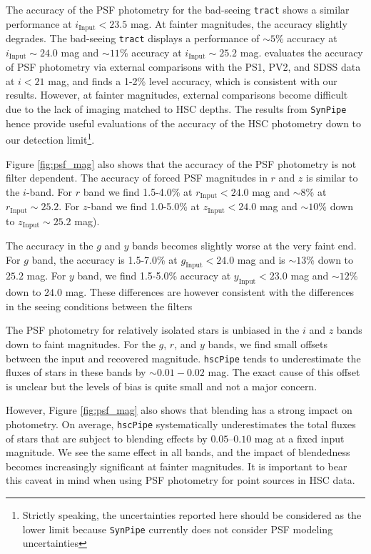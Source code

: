\documentclass[useamsfonts]{pasj01}
\def\hscpipe{\texttt{hscPipe}}
\def\synpipe{\texttt{SynPipe}}
\def\tract{\texttt{tract}}
\begin{document}
    The accuracy of the PSF photometry for the bad-seeing \tract{} shows a similar 
    performance at $i_{\mathrm{Input}}<23.5$ mag. 
    At fainter magnitudes, the accuracy slightly degrades. 
    The bad-seeing \tract{} displays a performance of ${\sim}5$\% accuracy at
    $i_{\mathrm{Input}}{\sim}24.0$ mag and ${\sim}11$\% accuracy at
    $i_{\mathrm{Input}}{\sim}25.2$ mag.
    \citet{HSCDR1} evaluates the accuracy of PSF photometry via external comparisons
    with the PS1, PV2, and SDSS data at $i<21$ mag, and finds a 1-2\% level accuracy,
    which is consistent with our results. 
    However, at fainter magnitudes, external comparisons become difficult due to the 
    lack of imaging matched to HSC depths.
    The results from \synpipe{} hence provide useful evaluations of the accuracy of 
    the HSC photometry down to our detection limit\footnote{Strictly speaking, the 
    uncertainties reported here should be considered as the lower limit because 
    \synpipe{} currently does not consider PSF modeling uncertainties}.

    Figure \ref{fig:psf_mag} also shows that the accuracy of the PSF photometry is 
    not filter dependent. 
    The accuracy of forced PSF magnitudes in $r$ and $z$ is similar to the $i$-band. 
    For $r$ band we find 1.5-4.0\% at $r_{\mathrm{Input}} < 24.0$ mag and ${\sim}8$\% 
    at $r_{\mathrm{Input}}{\sim}25.2$. 
    For $z$-band we find 1.0-5.0\% at $z_{\mathrm{Input}} < 24.0$ mag and ${\sim}10$\% 
    down to $z_{\mathrm{Input}}{\sim}25.2$ mag).
    
    The accuracy in the $g$ and $y$ bands becomes slightly worse at the very faint end. 
    For $g$ band, the accuracy is 1.5-7.0\% at $g_{\mathrm{Input}} < 24.0$ mag and is
    ${\sim}13$\% down to $25.2$ mag.
    For $y$ band, we find 1.5-5.0\% accuracy at $y_{\mathrm{Input}} < 23.0$ mag and
    ${\sim}12$\% down to $24.0$ mag. 
    These differences are however consistent with the differences in the seeing 
    conditions between the filters 

    The PSF photometry for relatively isolated stars is unbiased in the $i$ and $z$ 
    bands down to faint magnitudes. 
    For the $g$, $r$, and $y$ bands, we find small offsets between the input and 
    recovered magnitude. 
    \hscpipe{} tends to underestimate the fluxes of stars in these bands by 
    ${\sim}0.01-0.02$ mag. 
    The exact cause of this offset is unclear but the levels of bias is quite small 
    and not a major concern.  

	However, Figure \ref{fig:psf_mag} also shows that blending has a strong impact on 
	photometry.  
	On average, \hscpipe{} systematically underestimates the total fluxes of stars 
	that are subject to blending effects by $0.05$--$0.10$ mag at a fixed input magnitude.
    We see the same effect in all bands, and the impact of blendedness becomes
    increasingly significant at fainter magnitudes.
    It is important to bear this caveat in mind when using PSF photometry for point
    sources in HSC data.
\end{document}
